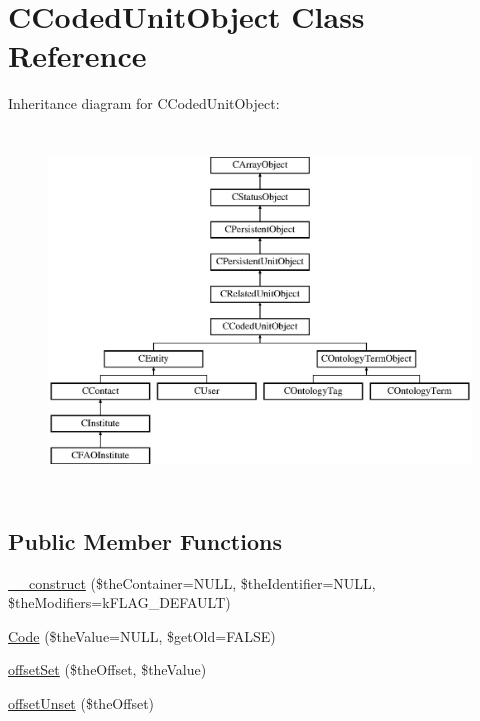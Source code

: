 \hypertarget{class_c_coded_unit_object}{\section{C\-Coded\-Unit\-Object Class Reference}
\label{class_c_coded_unit_object}
}
Inheritance diagram for C\-Coded\-Unit\-Object\-:\begin{figure}[H]
\begin{center}
\leavevmode
\includegraphics[height=9.655172cm]{class_c_coded_unit_object}
\end{center}
\end{figure}
\subsection*{Public Member Functions}
\begin{DoxyCompactItemize}
\item 
\hyperlink{class_c_coded_unit_object_a314fc62af62314f5ac5acca2ac809900}{\-\_\-\-\_\-construct} (\$the\-Container=N\-U\-L\-L, \$the\-Identifier=N\-U\-L\-L, \$the\-Modifiers=k\-F\-L\-A\-G\-\_\-\-D\-E\-F\-A\-U\-L\-T)
\item 
\hyperlink{class_c_coded_unit_object_a56af949800e65f9a283239d2e455259f}{Code} (\$the\-Value=N\-U\-L\-L, \$get\-Old=F\-A\-L\-S\-E)
\item 
\hyperlink{class_c_coded_unit_object_a49bb8f2956cb0551ba827b222778f295}{offset\-Set} (\$the\-Offset, \$the\-Value)
\item 
\hyperlink{class_c_coded_unit_object_a5072e0f72c19260df212a4cf93c9f1cb}{offset\-Unset} (\$the\-Offset)
\end{DoxyCompactItemize}
